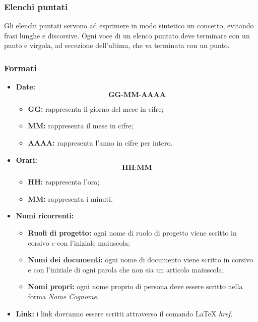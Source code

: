 \documentclass[../NormediProgetto.tex]{subfiles}
\begin{document}
\subsubsection{Elenchi puntati}

 Gli elenchi puntati servono ad esprimere in modo sintetico un concetto, evitando frasi lunghe e discorsive. Ogni voce di un elenco puntato deve terminare con un punto e virgola, ad eccezione dell’ultima, che va terminata con un punto.

\subsubsection{Formati}

\begin{itemize}

\item{\textbf{Date:}}  \[\textbf{GG-MM-AAAA}\]
\begin{itemize}
\item{\textbf{GG:}} rappresenta il giorno del mese in cifre;
\item{\textbf{MM:}} rappresenta il mese in cifre;
\item{\textbf{AAAA:}} rappresenta l'anno in cifre per intero.

\end{itemize}

\item{\textbf{Orari:}} \[\textbf{HH:MM}\]
\begin{itemize}
\item{\textbf{HH:}} rappresenta l'ora;
\item{\textbf{MM:}} rappresenta i minuti.
\end{itemize}

\item{\textbf{Nomi ricorrenti:}}
\begin{itemize}
\item{\textbf{Ruoli di progetto:}} ogni nome di ruolo di progetto viene scritto in corsivo e con l’iniziale maiuscola;
\item{\textbf{Nomi dei documenti:}}  ogni nome di documento viene scritto in corsivo e con l’iniziale di ogni parola che non sia un articolo maiuscola;
\item{\textbf{Nomi propri:}} ogni nome proprio di persona deve essere scritto nella forma \textit{Nome Cognome}.
\end{itemize}

\item{\textbf{Link:}} i link dovranno essere scritti attraverso il comando \LaTeX{} \textit{href}.
\end{itemize}
\end{document}
